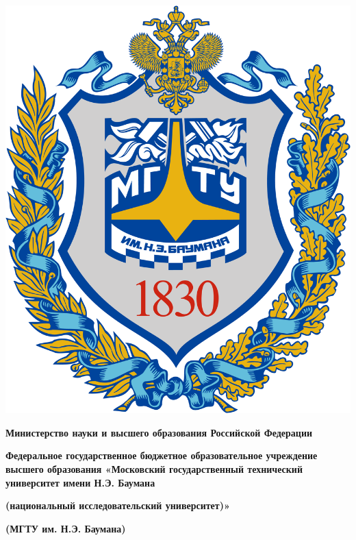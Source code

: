 \documentclass[a4paper,14pt]{extarticle}
\begin{document}
 	
 	\def\figurename{Рисунок}
 	
 	\begin{minipage}{0.2\textwidth}
 		\includegraphics[scale=0.05]{img/bmstu.png}
 	\end{minipage}
 	\begin{minipage}{0.7\textwidth}
 		\small
 		\begin{center}
 			\textbf{Министерство науки и высшего образования Российской Федерации}
 			
 			\textbf{Федеральное государственное бюджетное образовательное учреждение высшего образования «Московский государственный технический университет имени Н.Э. Баумана}
 			
 			\textbf{(национальный исследовательский университет)»}
 			
 			\textbf{(МГТУ им. Н.Э. Баумана)}
 		\end{center}
 	\end{minipage}
 	
 	\vspace*{5mm}
 	
 	\vspace*{30mm}
 	
\end{document}
